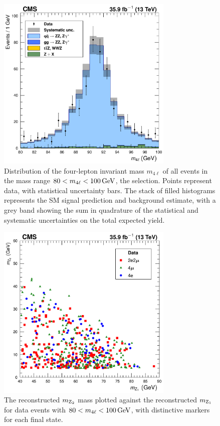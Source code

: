 \begin{figure}[htbp]
  \begin{center}
    \includegraphics[width=0.75\textwidth]{results/z4lzzMass.pdf}
    \caption[Four-lepton mass in the {\Zfourl} selection]{
        Distribution of the four-lepton invariant mass $m_{4\ell}$ of all events in the mass range $80 < m_{4\ell} < 100\,\mathrm{Ge\hspace{-.08em}V}$, the {\Zfourl} selection.
        Points represent data, with statistical uncertainty bars.
        The stack of filled histograms represents the SM signal prediction and background estimate, with a grey band showing the sum in quadrature of the statistical and systematic uncertainties on the total expected yield.
      }\label{fig:mass_z4l}
  \end{center}
\end{figure}

\begin{figure}[htbp]
  \begin{center}
    \includegraphics[width=0.75\textwidth]{results/mZ2VsmZ1_z4l.pdf}
    \caption[Scatter plot of $m_{\PZ_2}$ vs.\ $m_{\PZ_1}$ for data events in the {\Zfourl} selection]{
        The reconstructed $m_{\PZ_2}$ mass plotted against the reconstructed $m_{\PZ_1}$ for data events with $80 < m_{4\ell} < 100\,\mathrm{Ge\hspace{-.08em}V}$, with distinctive markers for each final state.
      }\label{fig:mZ2VsmZ1_z4l}
  \end{center}
\end{figure}



